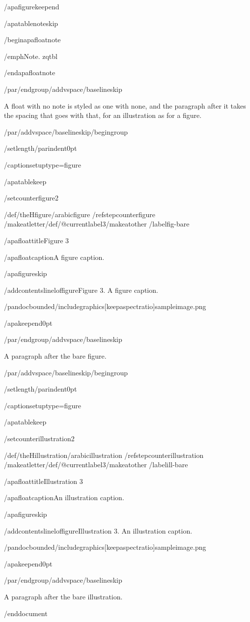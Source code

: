 /apafigurekeepend

/apatablenoteskip

/begin{apafloatnote}

/emph{Note}. zqtbl

/end{apafloatnote}

/par/endgroup/addvspace{/baselineskip}

A float with no note is styled as one with none, and the paragraph after
it takes the spacing that goes with that, for an illustration as for a
figure.

/par/addvspace{/baselineskip}/begingroup

/setlength{/parindent}{0pt}

/captionsetup{type=figure}

/apatablekeep

/setcounter{figure}{2}

/def/theHfigure{/arabic{figure}}%
/refstepcounter{figure}%
/makeatletter/def/@currentlabel{3}/makeatother%
/label{fig-bare}

/apafloattitle{Figure 3}

/apafloatcaption{A figure caption.}

/apafigureskip

/addcontentsline{lof}{figure}{Figure 3. A figure caption.}

/pandocbounded{/includegraphics[keepaspectratio]{sampleimage.png}}

/apakeepend{0pt}

/par/endgroup/addvspace{/baselineskip}

A paragraph after the bare figure.

/par/addvspace{/baselineskip}/begingroup

/setlength{/parindent}{0pt}

/captionsetup{type=figure}

/apatablekeep

/setcounter{illustration}{2}

/def/theHillustration{/arabic{illustration}}%
/refstepcounter{illustration}%
/makeatletter/def/@currentlabel{3}/makeatother%
/label{ill-bare}

/apafloattitle{Illustration 3}

/apafloatcaption{An illustration caption.}

/apafigureskip

/addcontentsline{lof}{figure}{Illustration 3. An illustration caption.}

/pandocbounded{/includegraphics[keepaspectratio]{sampleimage.png}}

/apakeepend{0pt}

/par/endgroup/addvspace{/baselineskip}

A paragraph after the bare illustration.




/end{document}
